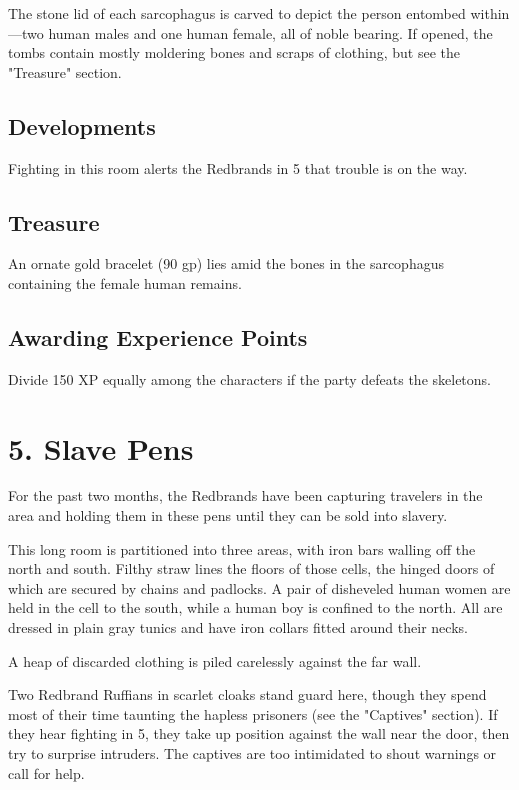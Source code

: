 \documentclass[10pt,a4paper,twoside,bg=print,twocolumn,openany,nodeprecatedcode]{dndbook}
\begin{document}
The stone lid of each sarcophagus is carved to depict the person entombed within—two human males and one human female, all of noble bearing. If opened, the tombs contain mostly moldering bones and scraps of clothing, but see the "Treasure" section.

\subsection{Developments}
Fighting in this room alerts the Redbrands in 5 that trouble is on the way.

\subsection{Treasure}
An ornate gold bracelet (90 gp) lies amid the bones in the sarcophagus containing the female human remains.

\subsection{Awarding Experience Points}
Divide 150 XP equally among the characters if the party defeats the skeletons.

\section{5. Slave Pens}
For the past two months, the Redbrands have been capturing travelers in the area and holding them in these pens until they can be sold into slavery.

\begin{DndReadAloud}{}
This long room is partitioned into three areas, with iron bars walling off the north and south. Filthy straw lines the floors of those cells, the hinged doors of which are secured by chains and padlocks. A pair of disheveled human women are held in the cell to the south, while a human boy is confined to the north. All are dressed in plain gray tunics and have iron collars fitted around their necks.

A heap of discarded clothing is piled carelessly against the far wall.

\end{DndReadAloud}

Two Redbrand Ruffians in scarlet cloaks stand guard here, though they spend most of their time taunting the hapless prisoners (see the "Captives" section). If they hear fighting in 5, they take up position against the wall near the door, then try to surprise intruders. The captives are too intimidated to shout warnings or call for help.
\end{document}
